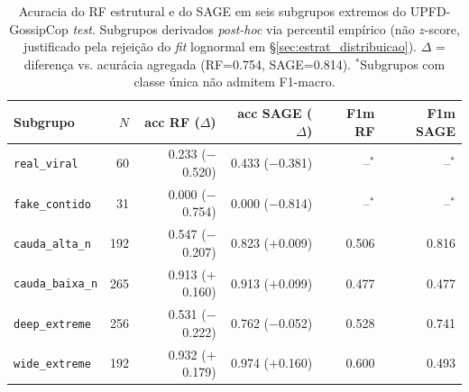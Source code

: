 \begin{table}[H]\centering
\caption{Acuracia do RF estrutural e do SAGE em seis subgrupos extremos do UPFD-GossipCop \emph{test}. Subgrupos derivados \emph{post-hoc} via percentil emp\'irico (n\~ao $z$-score, justificado pela rejei\c{c}\~ao do \emph{fit} lognormal em \S\ref{sec:estrat_distribuicao}). $\Delta$ = diferen\c{c}a vs. acur\'acia agregada (RF=0.754, SAGE=0.814). $^{*}$Subgrupos com classe \'unica n\~ao admitem F1-macro.}
\label{tab:outliers}
\small
\begin{tabular}{lrrrrr}
\toprule
\textbf{Subgrupo} & $N$ & \textbf{acc RF ($\Delta$)} & \textbf{acc SAGE ($\Delta$)} & \textbf{F1m RF} & \textbf{F1m SAGE} \\
\midrule
\texttt{real\_viral}     & 60  & 0.233 ($-$0.520) & 0.433 ($-$0.381) & --$^{*}$ & --$^{*}$ \\
\texttt{fake\_contido}   & 31  & 0.000 ($-$0.754) & 0.000 ($-$0.814) & --$^{*}$ & --$^{*}$ \\
\texttt{cauda\_alta\_n}  & 192 & 0.547 ($-$0.207) & 0.823 ($+$0.009) & 0.506 & 0.816 \\
\texttt{cauda\_baixa\_n} & 265 & 0.913 ($+$0.160) & 0.913 ($+$0.099) & 0.477 & 0.477 \\
\texttt{deep\_extreme}   & 256 & 0.531 ($-$0.222) & 0.762 ($-$0.052) & 0.528 & 0.741 \\
\texttt{wide\_extreme}   & 192 & 0.932 ($+$0.179) & 0.974 ($+$0.160) & 0.600 & 0.493 \\
\bottomrule
\end{tabular}
\end{table}
